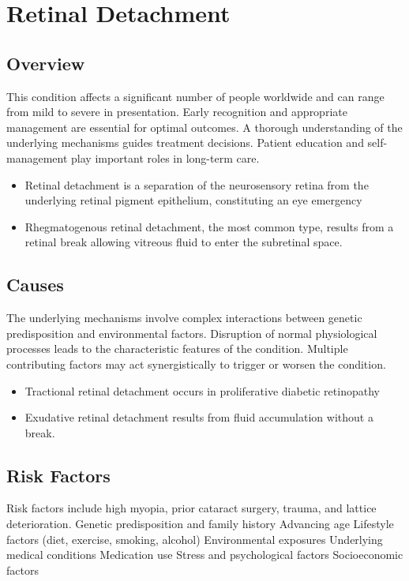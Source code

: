 \chapter{Retinal Detachment}
\label{sec:Retinal Detachment}

\section{Overview}
This condition affects a significant number of people worldwide and can range from mild to severe in presentation. Early recognition and appropriate management are essential for optimal outcomes. A thorough understanding of the underlying mechanisms guides treatment decisions. Patient education and self-management play important roles in long-term care.

\begin{itemize}[noitemsep]
  \item Retinal detachment is a separation of the neurosensory retina from the underlying retinal pigment epithelium, constituting an eye emergency
  \item Rhegmatogenous retinal detachment, the most common type, results from a retinal break allowing vitreous fluid to enter the subretinal space.
\end{itemize}
\section{Causes}
The underlying mechanisms involve complex interactions between genetic predisposition and environmental factors. Disruption of normal physiological processes leads to the characteristic features of the condition. Multiple contributing factors may act synergistically to trigger or worsen the condition.

\begin{itemize}[noitemsep]
  \item Tractional retinal detachment occurs in proliferative diabetic retinopathy
  \item Exudative retinal detachment results from fluid accumulation without a break.
\end{itemize}
\section{Risk Factors}
Risk factors include high myopia, prior cataract surgery, trauma, and lattice deterioration. Genetic predisposition and family history Advancing age Lifestyle factors (diet, exercise, smoking, alcohol) Environmental exposures Underlying medical conditions Medication use Stress and psychological factors Socioeconomic factors

